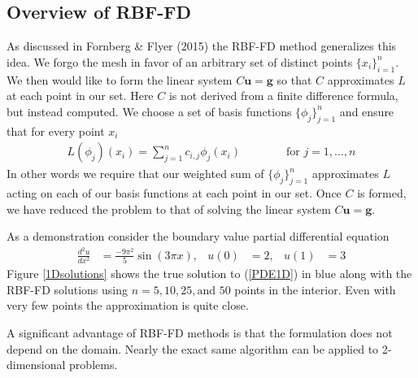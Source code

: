 \documentclass[12pt]{article}
\let\vec\mathbf
\begin{document}
\subsection{Overview of RBF-FD}	\label{sec_overview_rbffd}
As discussed in Fornberg \& Flyer (2015)\cite{Fornberg2015} the RBF-FD method generalizes this idea. We forgo the mesh in favor of an arbitrary set of distinct points $\{x_i\}_{i=1}^n$. We then would like to form the linear system $C\vec{u} = \vec{g}$ so that $C$ approximates $L$ at each point in our set. Here $C$ is not derived from a finite difference formula, but instead computed. We choose a set of basis functions $\{\phi_j\}_{j=1}^n$ and ensure that for every point $x_i$
\begin{align}
L(\phi_j)(x_i) = \sum\limits_{j=1}^{n} c_{i,j} \phi_j(x_i) \phantom{===} \text{for } j=1,...,n \label{row_coef}
\end{align}
In other words we require that our weighted sum of $\{\phi_j\}_{j=1}^n$ approximates $L$ acting on each of our basis functions at each point in our set. Once $C$ is formed, we have reduced the problem to that of solving the linear system $C\vec{u} = \vec{g}$. \bigbreak


As a demonstration consider the boundary value partial differential equation
\begin{align}
\frac{d^2u}{dx^2} &= \frac{-9\pi^2}{5}\sin(3\pi x), & u(0)&=2, & u(1)&=3 \label{PDE1D}
\end{align}
Figure \ref{1Dsolutions} shows the true solution to (\ref{PDE1D}) in blue along with the RBF-FD solutions using $n=5,10,25, \text{and } 50$ points in the interior. Even with very few points the approximation is quite close. \bigbreak

A significant advantage of RBF-FD methods is that the formulation does not depend on the domain. Nearly the exact same algorithm can be applied to 2-dimensional problems. \bigbreak
\end{document}
